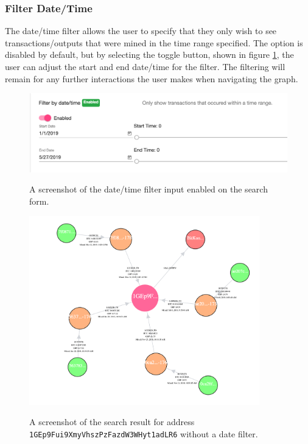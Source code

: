 \subsubsection{Filter Date/Time}
The date/time filter allows the user to specify that they only wish to see transactions/outputs that were mined in the time range specified. The option is disabled by default, but by selecting the toggle button, shown in figure \ref{fig:date-time-filter}, the user can adjust the start and end date/time for the filter. The filtering will remain for any further interactions the user makes when navigating the graph. 

\begin{figure}[h!]
  \centering
  \includegraphics[width = 15cm]{./figures/ui-screenshots/date-time-filter}\\[0.5cm] 
  \caption{A screenshot of the date/time filter input enabled on the search form.}
  \label{fig:date-time-filter}
\end{figure}
\begin{figure}[h!]
  \centering
  \includegraphics[width = 10cm]{./figures/ui-screenshots/time-filter-result-all}\\[0.5cm] 
  \caption{A screenshot of the search result for address \texttt{1GEp9Fui9XmyVhszPzFazdW3WHyt1adLR6} without a date filter.}
  \label{fig:date-time-filter-without}
\end{figure}
